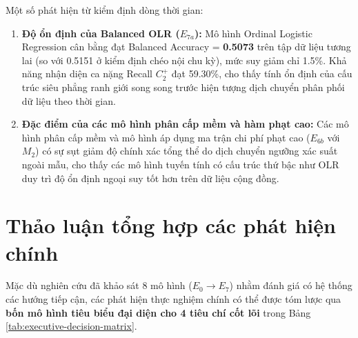 Một số phát hiện từ kiểm định dòng thời gian:
\begin{enumerate}
    \item \textbf{Độ ổn định của Balanced OLR ($E_{7a}$):} Mô hình Ordinal Logistic Regression cân bằng đạt Balanced Accuracy = \textbf{0.5073} trên tập dữ liệu tương lai (so với 0.5151 ở kiểm định chéo nội chu kỳ), mức suy giảm chỉ 1.5\%. Khả năng nhận diện ca nặng Recall $C_2^+$ đạt 59.30\%, cho thấy tính ổn định của cấu trúc siêu phẳng ranh giới song song trước hiện tượng dịch chuyển phân phối dữ liệu theo thời gian.
    \item \textbf{Đặc điểm của các mô hình phân cấp mềm và hàm phạt cao:} Các mô hình phân cấp mềm và mô hình áp dụng ma trận chi phí phạt cao ($E_{6b}$ với $M_2$) có sự sụt giảm độ chính xác tổng thể do dịch chuyển ngưỡng xác suất ngoài mẫu, cho thấy các mô hình tuyến tính có cấu trúc thứ bậc như OLR duy trì độ ổn định ngoại suy tốt hơn trên dữ liệu cộng đồng.
\end{enumerate}

\section{Thảo luận tổng hợp các phát hiện chính}
\label{sec:thao-luan-tong-hop}

Mặc dù nghiên cứu đã khảo sát 8 mô hình ($E_0 \to E_7$) nhằm đánh giá có hệ thống các hướng tiếp cận, các phát hiện thực nghiệm chính có thể được tóm lược qua \textbf{bốn mô hình tiêu biểu đại diện cho 4 tiêu chí cốt lõi} trong Bảng \ref{tab:executive-decision-matrix}.



